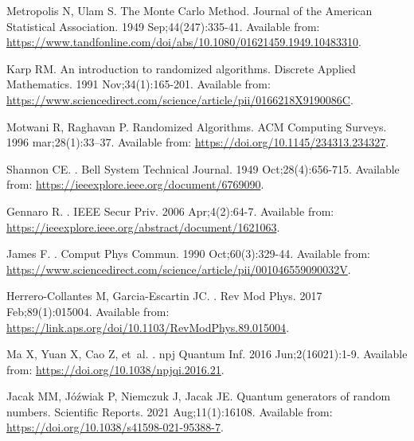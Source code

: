\documentclass[]{interact}
\theoremstyle{plain}%
\theoremstyle{definition}
\theoremstyle{remark}
\begin{document}
\begin{thebibliography}{100}

Metropolis N, Ulam S.
\newblock The Monte Carlo Method.
\newblock Journal of the American Statistical Association. 1949
  Sep;44(247):335-41.
\newblock Available from:
  \url{https://www.tandfonline.com/doi/abs/10.1080/01621459.1949.10483310}.

Karp RM.
\newblock An introduction to randomized algorithms.
\newblock Discrete Applied Mathematics. 1991 Nov;34(1):165-201.
\newblock Available from:
  \url{https://www.sciencedirect.com/science/article/pii/0166218X9190086C}.

Motwani R, Raghavan P.
\newblock Randomized Algorithms.
\newblock ACM Computing Surveys. 1996 mar;28(1):33–37.
\newblock Available from: \url{https://doi.org/10.1145/234313.234327}.

Shannon CE.
.
\newblock Bell System Technical Journal. 1949 Oct;28(4):656-715.
\newblock Available from: \url{https://ieeexplore.ieee.org/document/6769090}.

Gennaro R.
.
\newblock IEEE Secur Priv. 2006 Apr;4(2):64-7.
\newblock Available from:
  \url{https://ieeexplore.ieee.org/abstract/document/1621063}.

James F.
.
\newblock Comput Phys Commun. 1990 Oct;60(3):329-44.
\newblock Available from:
  \url{https://www.sciencedirect.com/science/article/pii/001046559090032V}.

Herrero-Collantes M, Garcia-Escartin JC.
.
\newblock Rev Mod Phys. 2017 Feb;89(1):015004.
\newblock Available from:
  \url{https://link.aps.org/doi/10.1103/RevModPhys.89.015004}.

Ma X, Yuan X, Cao Z, et~al.
.
\newblock npj Quantum Inf. 2016 Jun;2(16021):1-9.
\newblock Available from: \url{https://doi.org/10.1038/npjqi.2016.21}.

Jacak MM, J{\'o}{\'{z}}wiak P, Niemczuk J, Jacak JE.
\newblock Quantum generators of random numbers.
\newblock Scientific Reports. 2021 Aug;11(1):16108.
\newblock Available from: \url{https://doi.org/10.1038/s41598-021-95388-7}.


\end{thebibliography}
\end{document}
